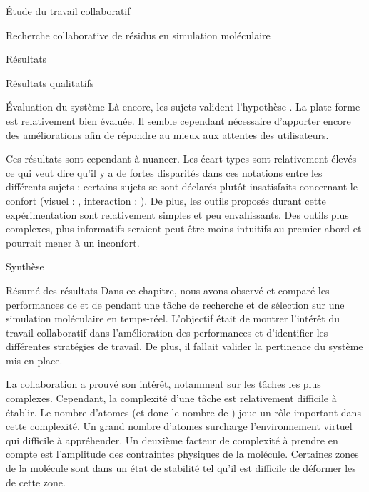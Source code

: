 \documentclass[myfrancais]{mythesis}
\begin{document}
\begin{mypart}{Étude du travail collaboratif}
\begin{mychapter}{Recherche collaborative de résidus en simulation moléculaire}
\begin{mysection}{Résultats}
\begin{mysubsection}{Résultats qualitatifs}
\begin{mysubsubsection}{Évaluation du système}
						Là encore, les sujets valident l'hypothèse .
						La plate-forme est relativement bien évaluée.
						Il semble cependant nécessaire d'apporter encore des améliorations afin de répondre au mieux aux attentes des utilisateurs.

						Ces résultats sont cependant à nuancer.
						Les écart-types sont relativement élevés ce qui veut dire qu'il y a de fortes disparités dans ces notations entre les différents sujets : certains sujets se sont déclarés plutôt insatisfaits concernant le confort (visuel : \mynum{2}, interaction : ).
						De plus, les outils proposés durant cette expérimentation sont relativement simples et peu envahissants.
						Des outils plus complexes, plus informatifs seraient peut-être moins intuitifs au premier abord et pourrait mener à un inconfort.
					\end{mysubsubsection}
				\end{mysubsection}
			\end{mysection}
			\begin{mysection}{Synthèse}
				\begin{mysubsection}{Résumé des résultats}
					Dans ce chapitre, nous avons observé et comparé les performances de  et de  pendant une tâche de recherche et de sélection sur une simulation moléculaire en temps-réel.
					L'objectif était de montrer l'intérêt du travail collaboratif dans l'amélioration des performances et d'identifier les différentes stratégies de travail.
					De plus, il fallait valider la pertinence du système mis en place.

					La collaboration a prouvé son intérêt, notamment sur les tâches les plus complexes.
					Cependant, la complexité d'une tâche est relativement difficile à établir.
					Le nombre d'atomes (et donc le nombre de ) joue un rôle important dans cette complexité.
					Un grand nombre d'atomes surcharge l'environnement virtuel qui difficile à appréhender.
					Un deuxième facteur de complexité à prendre en compte est l'amplitude des contraintes physiques de la molécule.
					Certaines zones de la molécule sont dans un état de stabilité tel qu'il est difficile de déformer les  de cette zone.


\end{mysubsection}
\end{mysection}
\end{mychapter}
\end{mypart}
\end{document}
